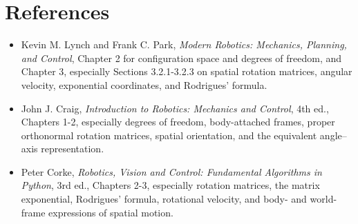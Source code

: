 \documentclass[
  australian,
  12pt,
  letterpaper,
  DIV=11,
  numbers=noendperiod,
  twoside]{scrreprt}
\providecommand{\tightlist}{%
  \setlength{\itemsep}{0pt}\setlength{\parskip}{0pt}}
\begin{document}
\section*{References}\label{references-5}


\begin{itemize}
\tightlist
\item
  Kevin M. Lynch and Frank C. Park, \emph{Modern Robotics: Mechanics,
  Planning, and Control}, Chapter 2 for configuration space and degrees
  of freedom, and Chapter 3, especially Sections 3.2.1-3.2.3 on spatial
  rotation matrices, angular velocity, exponential coordinates, and
  Rodrigues' formula.
\item
  John J. Craig, \emph{Introduction to Robotics: Mechanics and Control},
  4th ed., Chapters 1-2, especially degrees of freedom, body-attached
  frames, proper orthonormal rotation matrices, spatial orientation, and
  the equivalent angle--axis representation.
\item
  Peter Corke, \emph{Robotics, Vision and Control: Fundamental
  Algorithms in Python}, 3rd ed., Chapters 2-3, especially rotation
  matrices, the matrix exponential, Rodrigues' formula, rotational
  velocity, and body- and world-frame expressions of spatial motion.
\end{itemize}
\end{document}
